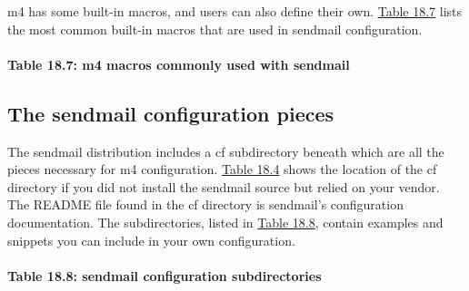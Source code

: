 {m4} has some built-in macros, and users can also define their own.
\protect\hyperlink{part0026_split_029.htmlux5cux23_idTextAnchor1055}{Table
18.7} lists the most common built-in macros that are used in {sendmail}
configuration.

\paragraph[{Table 18.7: } macros commonly used with
{sendmail}]{\texorpdfstring{{Table 18.7:
}{\protect\hypertarget{part0026_split_029.htmlux5cux23_idTextAnchor1055}{}{}\protect\hypertarget{part0026_split_029.htmlux5cux23_idTextAnchor1056}{}{}m4}
macros commonly used with
{sendmail}}{Table 18.7: m4 macros commonly used with sendmail}}


\protect\hypertarget{part0026_split_030.html}{}{}

\hypertarget{part0026_split_030.htmlux5cux23_idContainer1247}{}
\hypertarget{part0026_split_030.htmlux5cux23calibre_pb_29}{%
\subsection[The {sendmail} configuration
pieces]{\texorpdfstring{\protect\hypertarget{part0026_split_030.htmlux5cux23_idTextAnchor1057}{}{}The
{sendmail} configuration
pieces}{The sendmail configuration pieces}}\label{part0026_split_030.htmlux5cux23calibre_pb_29}}

The {sendmail} distribution includes a {cf} subdirectory beneath which
are all the pieces necessary for {m4} configuration.
\protect\hyperlink{part0026_split_024.htmlux5cux23_idTextAnchor1045}{Table
18.4} shows the location of the {cf} directory if you did not install
the {sendmail} source but relied on your vendor. The {README} file found
in the {cf} directory is {sendmail}'s configuration documentation. The
subdirectories, listed in
\protect\hyperlink{part0026_split_030.htmlux5cux23_idTextAnchor1058}{Table
18.8}, contain examples and snippets you can include in your own
configuration.

\paragraph[{Table 18.8: } configuration
subdirectories]{\texorpdfstring{{Table 18.8:
}{\protect\hypertarget{part0026_split_030.htmlux5cux23_idTextAnchor1058}{}{}\protect\hypertarget{part0026_split_030.htmlux5cux23_idTextAnchor1059}{}{}sendmail}
configuration
subdirectories}{Table 18.8: sendmail configuration subdirectories}}

